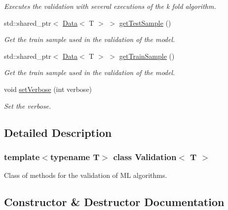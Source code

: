 \begin{DoxyCompactItemize}
\begin{DoxyCompactList}\small\item\em Executes the validation with several executions of the k fold algorithm. \end{DoxyCompactList}\item 
std\+::shared\+\_\+ptr$<$ \mbox{\hyperlink{class_data}{Data}}$<$ T $>$ $>$ \mbox{\hyperlink{class_validation_a2370445658f5e86e39e8c18fc8b971d0}{get\+Test\+Sample}} ()
\begin{DoxyCompactList}\small\item\em Get the train sample used in the validation of the model. \end{DoxyCompactList}\item 
std\+::shared\+\_\+ptr$<$ \mbox{\hyperlink{class_data}{Data}}$<$ T $>$ $>$ \mbox{\hyperlink{class_validation_a11cf518681b25799f231ce973ad45095}{get\+Train\+Sample}} ()
\begin{DoxyCompactList}\small\item\em Get the train sample used in the validation of the model. \end{DoxyCompactList}\item 
void \mbox{\hyperlink{class_validation_adddf2e9eb960b7636e6615ecbd9783bb}{set\+Verbose}} (int verbose)
\begin{DoxyCompactList}\small\item\em Set the verbose. \end{DoxyCompactList}\end{DoxyCompactItemize}


\subsection{Detailed Description}
\subsubsection*{template$<$typename T$>$\newline
class Validation$<$ T $>$}

Class of methods for the validation of ML algorithms. 

\subsection{Constructor \& Destructor Documentation}
\mbox{\label{class_validation_a91399f8b544cb22de02b85618ef5b0cc}} 
